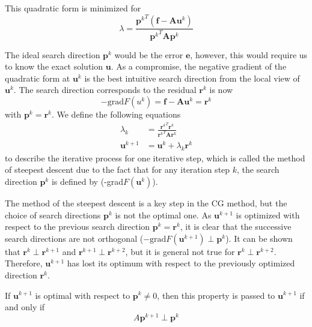 This quadratic form is minimized for 
\begin{equation}
    \lambda = \frac{{\boldsymbol{p}^k}^T(\boldsymbol{f} - \boldsymbol{A}\boldsymbol{u}^k)}
    {{\boldsymbol{p}^k}^{T}\boldsymbol{A}\boldsymbol{p}^k}
\end{equation}

The ideal search direction $\boldsymbol{p}^k$ would be the error $\boldsymbol{e}$, however, this would require us to know the exact solution $\boldsymbol{u}$. As a compromise, the negative gradient of the quadratic form at $\boldsymbol{u}^k$ is the best intuitive search direction from the local view of $\boldsymbol{u}^k$. The search direction corresponds to the residual $\boldsymbol{r}^k$ is now
\begin{equation}
    -\text{grad} F(u^k) = \boldsymbol{f} - \boldsymbol{A}\boldsymbol{u}^k = \boldsymbol{r}^k
\end{equation}
with $\boldsymbol{p}^k = \boldsymbol{r}^k$. We define the following equations
\begin{align}
    \lambda_k &= \frac{{\boldsymbol{r}^k}^T\boldsymbol{r}^k}{{\boldsymbol{r}^k}^T\boldsymbol{A}\boldsymbol{r}^k} \\
    \boldsymbol{u}^{k+1} &= \boldsymbol{u}^k + \lambda_k\boldsymbol{r}^k
\end{align}
to describe the iterative process for one iterative step, which is called the method of steepest descent due to the fact that for any iteration step $k$, the search direction $\boldsymbol{p}^k$ is defined by (-grad$F(\boldsymbol{u}^k)$).

The method of the steepest descent is a key step in the CG method, but the choice of search directions $\boldsymbol{p}^k$ is not the optimal one. As $\boldsymbol{u}^{k+1}$ is optimized with respect to the previous search direction $\boldsymbol{p}^k = \boldsymbol{r}^k$, it is clear that the successive search directions are not orthogonal ($-\text{grad}F(\boldsymbol{u}^{k+1}) \perp \boldsymbol{p}^k$). It can be shown that $\boldsymbol{r}^k \perp \boldsymbol{r}^{k+1}$ and $\boldsymbol{r}^{k+1} \perp \boldsymbol{r}^{k+2}$, but it is general not true for $\boldsymbol{r}^k \perp \boldsymbol{r}^{k+2}$. Therefore, $\boldsymbol{u}^{k+1}$ has lost its optimum with respect to the previously optimized direction $\boldsymbol{r}^k$.

If $\boldsymbol{u}^{k+1}$ is optimal with respect to $\boldsymbol{p}^k \neq 0$, then this property is passed to $\boldsymbol{u}^{k+1}$ if and only if 
\begin{equation}
    A\boldsymbol{p}^{k+1} \perp \boldsymbol{p}^k
\end{equation}

